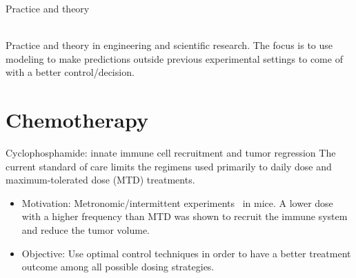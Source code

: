 \documentclass[10pt]{beamer}
\newcommand\myscalefactor{0.5}
\begin{document}
\begin{frame}{Practice and theory}
		  \hspace{1cm}
	\\ \vspace{0.5cm}
	\small
	Practice and theory in engineering and scientific research. The focus is to use modeling to make predictions outside previous experimental settings to come of with a better control/decision. 
\end{frame}

\section{Chemotherapy}

\begin{frame}{Cyclophosphamide: innate immune cell recruitment and tumor regression}
	The current standard of care limits the regimens used primarily to daily dose and maximum-tolerated dose (MTD) treatments.
	\vspace{1cm}
	\begin{itemize}
		\item Motivation: Metronomic/intermittent experiments~ in mice. A lower dose with a higher frequency than MTD was shown to recruit the immune system and reduce the tumor volume.
		\vspace{0.5cm}
		\item Objective: Use optimal control techniques in order to have a better treatment outcome among all possible dosing strategies.
	\end{itemize}
\end{frame}
\end{document}
